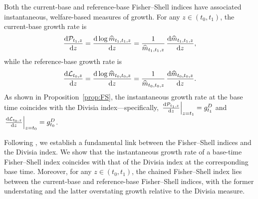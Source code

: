 \documentclass[12pt,a4paper]{article}
\newtheorem{proposition}{Proposition}
\begin{document}
Both the current-base and reference-base Fisher–Shell indices have associated instantaneous, welfare-based measures of growth. For any \( z \in (t_0, t_1) \), the current-base growth rate is 
\begin{equation}\label{eq:BBEVgrowth}
\frac{\text{d} {\cal P}_{t_1,z}}{\text{d} z} = \frac{\text{d} \log\widehat{m}_{t_1,t_1,z}}{\text{d} z} = \frac{1}{\widehat{m}_{t_1,t_1,z}} \, \frac{\text{d} \widehat{m}_{t_1,t_1,z}}{\text{d} z},
\end{equation}
while the reference-base growth rate is 
\begin{equation}\label{eq:BBEVgrowthb}
\frac{\text{d}{\cal L}_{t_0,z}}{\text{d} z} = \frac{\text{d}\log \widehat{m}_{t_0,t_0,z}}{\text{d} z} = \frac{1}{\widehat{m}_{t_0,t_0,z}} \, \frac{\text{d} \widehat{m}_{t_0,t_0,z}}{\text{d} z}.
\end{equation}
As shown in Proposition~\ref{prop:FS}, the instantaneous growth rate at the base time coincides with the Divisia index—specifically, \( \left. \frac{\text{d}{\cal P}_{t_1,z}}{\text{d}z} \right|_{z=t_1} = g^D_{t_1} \) and \( \left. \frac{\text{d}{\cal L}_{t_0,z}}{\text{d}z} \right|_{z=t_0} = g^D_{t_0} \).

Following \cite{duran_licandro_2024}, we establish a fundamental link between the Fisher–Shell indices and the Divisia index.  
We show that the instantaneous growth rate of a base-time Fisher–Shell index coincides with that of the Divisia index at the corresponding base time.  
Moreover, for any \( z \in (t_0, t_1) \), the chained Fisher–Shell index lies between the current-base and reference-base Fisher–Shell indices, with the former understating and the latter overstating growth relative to the Divisia measure.

\end{document}
